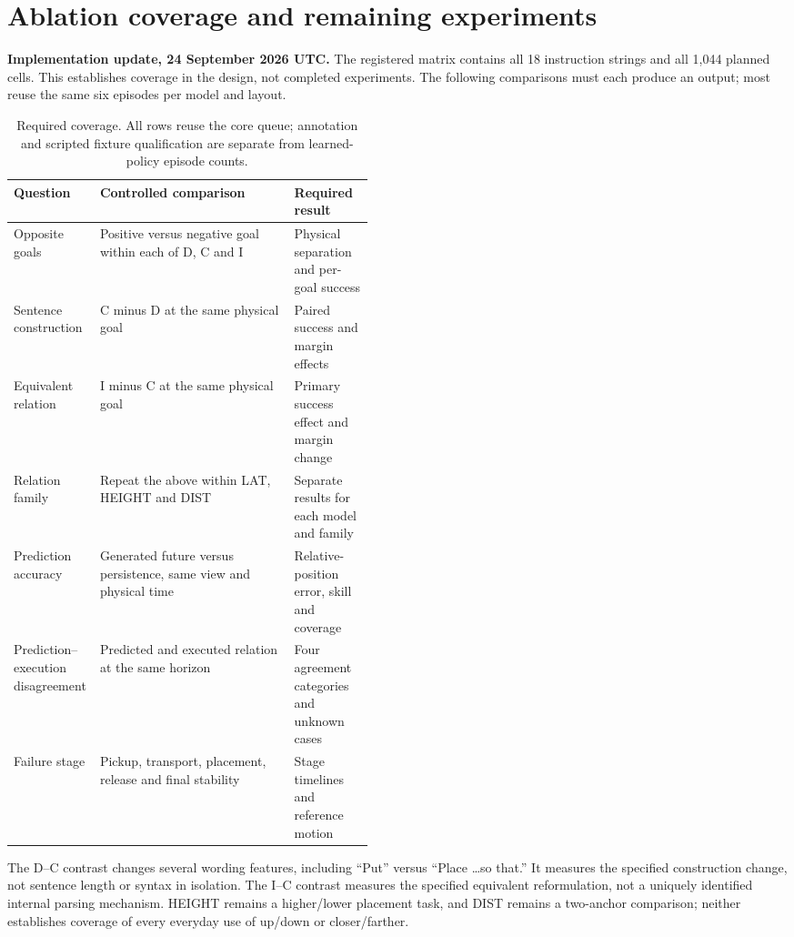 \section{Ablation coverage and remaining experiments}
\label{sec:coverage-update}
\textbf{Implementation update, 24 September 2026 UTC.}
The registered matrix contains all 18 instruction strings and all 1,044 planned cells. This establishes coverage in the design, not completed experiments. The following comparisons must each produce an output; most reuse the same six episodes per model and layout.

\begin{table}[ht]
\centering\small
\begin{tabularx}{\linewidth}{@{}p{0.24\linewidth}Xp{0.22\linewidth}@{}}
\toprule
Question & Controlled comparison & Required result \\
\midrule
Opposite goals & Positive versus negative goal within each of D, C and I & Physical separation and per-goal success \\
Sentence construction & C minus D at the same physical goal & Paired success and margin effects \\
Equivalent relation & I minus C at the same physical goal & Primary success effect and margin change \\
Relation family & Repeat the above within LAT, HEIGHT and DIST & Separate results for each model and family \\
Prediction accuracy & Generated future versus persistence, same view and physical time & Relative-position error, skill and coverage \\
Prediction--execution disagreement & Predicted and executed relation at the same horizon & Four agreement categories and unknown cases \\
Failure stage & Pickup, transport, placement, release and final stability & Stage timelines and reference motion \\
\bottomrule
\end{tabularx}
\caption{Required coverage. All rows reuse the core queue; annotation and scripted fixture qualification are separate from learned-policy episode counts.}
\end{table}

The D--C contrast changes several wording features, including ``Put'' versus ``Place \ldots so that.'' It measures the specified construction change, not sentence length or syntax in isolation. The I--C contrast measures the specified equivalent reformulation, not a uniquely identified internal parsing mechanism. HEIGHT remains a higher/lower placement task, and DIST remains a two-anchor comparison; neither establishes coverage of every everyday use of up/down or closer/farther.

